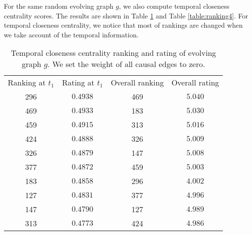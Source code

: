 \documentclass[12pt]{article}
\theoremstyle{definition}
\begin{document}
For the same random evolving graph $g$, we also compute temporal closeness centrality scores.
The results are shown in Table \ref{table:ranking3} and Table \ref{table:ranking4}.
For temporal closeness centrality, we notice that most of rankings are changed when we take account of the temporal information.


\begin{table}[h]
  \begin{center}
\begin{tabular}{ c | c | c | c }
  Ranking at $t_1$ & Rating at $t_1$ & Overall ranking & Overall rating \\
   296 & $0.4938$ & 469 & $5.040$ \\
   469 & $0.4933$ & 183 & $5.030$ \\
   459 & $0.4915$ & 313 & $5.016$ \\
   424 & $0.4888$ & 326 & $5.009$ \\
   326 & $0.4879$ & 147 & $5.008$ \\
   377 & $0.4872$ & 459 & $5.003$ \\
   183 & $0.4858$ & 296 & $4.002$ \\
   127 & $0.4831$ & 377 & $4.996$ \\
   147 & $0.4790$ & 127 & $4.989$ \\
   313 & $0.4773$ & 424 & $4.986$ \\
\end{tabular}
\end{center}
\caption{Temporal closeness centrality ranking and rating of evolving graph $g$.
We set the weight of all causal edges to zero.}
\label{table:ranking3}
\end{table}
\end{document}
